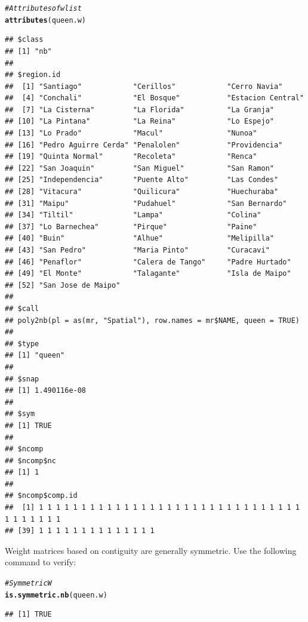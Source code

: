 \documentclass[english,12pt]{book}\usepackage[]{graphicx}\usepackage[]{xcolor}
\makeatletter
\newcommand{\hlcom}[1]{\textcolor[rgb]{0.678,0.584,0.686}{\textit{#1}}}%
\newcommand{\hldef}[1]{\textcolor[rgb]{0.345,0.345,0.345}{#1}}%
\newcommand{\hlkwd}[1]{\textcolor[rgb]{0.737,0.353,0.396}{\textbf{#1}}}%
\newenvironment{kframe}{%
 \def\at@end@of@kframe{}%
 \ifinner\ifhmode%
  \def\at@end@of@kframe{\end{minipage}}%
  \begin{minipage}{\columnwidth}%
 \fi\fi%
 \def\FrameCommand##1{\hskip\@totalleftmargin \hskip-\fboxsep
 \colorbox{shadecolor}{##1}\hskip-\fboxsep
     \hskip-\linewidth \hskip-\@totalleftmargin \hskip\columnwidth}%
 \MakeFramed {\advance\hsize-\width
   \@totalleftmargin\z@ \linewidth\hsize
   \@setminipage}}%
 {\par\unskip\endMakeFramed%
 \at@end@of@kframe}
\newenvironment{knitrout}{}{} %
\makeatother
\begin{document}
\begin{knitrout}
\color{fgcolor}\begin{kframe}
\begin{alltt}
\hlcom{# Attributes of wlist}
\hlkwd{attributes}\hldef{(queen.w)}
\end{alltt}
\begin{verbatim}
## $class
## [1] "nb"
## 
## $region.id
##  [1] "Santiago"            "Cerillos"            "Cerro Navia"        
##  [4] "Conchali"            "El Bosque"           "Estacion Central"   
##  [7] "La Cisterna"         "La Florida"          "La Granja"          
## [10] "La Pintana"          "La Reina"            "Lo Espejo"          
## [13] "Lo Prado"            "Macul"               "Nunoa"              
## [16] "Pedro Aguirre Cerda" "Penalolen"           "Providencia"        
## [19] "Quinta Normal"       "Recoleta"            "Renca"              
## [22] "San Joaquin"         "San Miguel"          "San Ramon"          
## [25] "Independencia"       "Puente Alto"         "Las Condes"         
## [28] "Vitacura"            "Quilicura"           "Huechuraba"         
## [31] "Maipu"               "Pudahuel"            "San Bernardo"       
## [34] "Tiltil"              "Lampa"               "Colina"             
## [37] "Lo Barnechea"        "Pirque"              "Paine"              
## [40] "Buin"                "Alhue"               "Melipilla"          
## [43] "San Pedro"           "Maria Pinto"         "Curacavi"           
## [46] "Penaflor"            "Calera de Tango"     "Padre Hurtado"      
## [49] "El Monte"            "Talagante"           "Isla de Maipo"      
## [52] "San Jose de Maipo"  
## 
## $call
## poly2nb(pl = as(mr, "Spatial"), row.names = mr$NAME, queen = TRUE)
## 
## $type
## [1] "queen"
## 
## $snap
## [1] 1.490116e-08
## 
## $sym
## [1] TRUE
## 
## $ncomp
## $ncomp$nc
## [1] 1
## 
## $ncomp$comp.id
##  [1] 1 1 1 1 1 1 1 1 1 1 1 1 1 1 1 1 1 1 1 1 1 1 1 1 1 1 1 1 1 1 1 1 1 1 1 1 1 1
## [39] 1 1 1 1 1 1 1 1 1 1 1 1 1 1
\end{verbatim}
\end{kframe}
\end{knitrout}

Weight matrices based on contiguity are generally symmetric. Use the following command to verify:
\begin{knitrout}
\color{fgcolor}\begin{kframe}
\begin{alltt}
\hlcom{# Symmetric W}
\hlkwd{is.symmetric.nb}\hldef{(queen.w)}
\end{alltt}
\begin{verbatim}
## [1] TRUE
\end{verbatim}
\end{kframe}
\end{knitrout}
\end{document}
